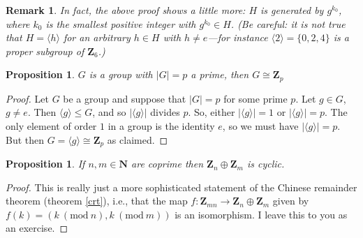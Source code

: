 \documentclass[12pt]{article}
\numberwithin{equation}{subsection}
\newtheorem{prop}[subsection]{Proposition}
\theoremstyle{note}
\newtheorem{remark}[subsection]{Remark}
\newcommand{\Mod}[1]{\ (\mathrm{mod}\ #1)}
\begin{document}
\begin{remark} 
In fact, the above proof shows a little more: $H$ is generated by $g^{k_0}$, where $k_0$ is the \textit{smallest} positive integer with $g^{k_0}\in H$. (Be careful: it is \textit{not} true that $H=\langle h\rangle$ for an arbitrary $h\in H$ with $h\neq e$---for instance $\langle 2\rangle=\{0,2,4\}$ is a proper subgroup of $\mathbf{Z}_6$.) 

\end{remark}

\begin{prop} $G$ is a group with $|G|=p$ a prime, then $G\cong \mathbf{Z}_p$
\end{prop}

\begin{proof}
	Let $G$ be a group and suppose that $|G|=p$ for some prime $p$. Let $g\in G$, $g\neq e$. Then $\langle g\rangle \leq G$, and so $|\langle g\rangle |$ divides $p$. So, either $|\langle g \rangle |=1$ or $|\langle g \rangle |=p$. The only element of order $1$ in a group is the identity $e$, so we must have $|\langle g\rangle |=p$. But then $G=\langle g\rangle \cong \mathbf{Z}_p$ as claimed. 
\end{proof}

\begin{prop} \label{crt-group-version}
	If $n,m\in\mathbf{N}$ are coprime then $\mathbf{Z}_n \oplus \mathbf{Z}_m$ is cyclic. 
\end{prop}

\begin{proof}
This is really just a more sophisticated statement of the Chinese remainder theorem (theorem \ref{crt}), i.e., that the map $f\colon \mathbf{Z}_{mn}\to \mathbf{Z}_n\oplus \mathbf{Z}_m$ given by $f(k)=(k\Mod{n}, k\Mod{m})$ is an isomorphism. I leave this to you as an exercise.
\end{proof}


	
\end{document}
